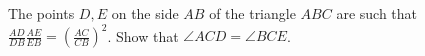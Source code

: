 The points $D, E$ on the side $AB$ of the triangle $ABC$ are such that $\frac{AD}{DB}\frac{AE}{EB} = \left(\frac{AC}{CB}\right)^2$. Show that $\angle ACD = \angle BCE$.